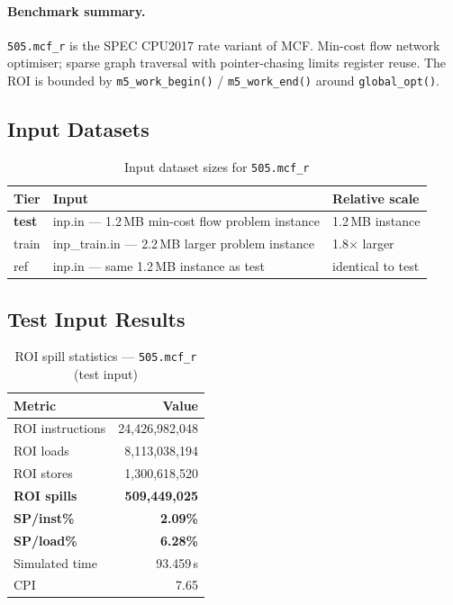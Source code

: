 \documentclass[11pt,a4paper]{article}
\begin{document}
\paragraph{Benchmark summary.}
\texttt{505.mcf\_r} is the SPEC CPU2017 rate variant of MCF.
Min-cost flow network optimiser; sparse graph traversal with pointer-chasing limits register reuse.
The ROI is bounded by \texttt{m5\_work\_begin()} / \texttt{m5\_work\_end()}
around \texttt{global\_opt()}.

\subsection{Input Datasets}

\begin{table}[H]
\centering
\caption{Input dataset sizes for \texttt{505.mcf\_r}}
\label{tab:mcf_inputs}
\small
\begin{tabular}{lp{8cm}l}
\toprule
\textbf{Tier} & \textbf{Input} & \textbf{Relative scale} \\
\midrule
\textbf{test} & inp.in --- 1.2\,MB min-cost flow problem instance & 1.2\,MB instance \\
train & inp\_train.in --- 2.2\,MB larger problem instance & 1.8$\times$ larger \\
ref & inp.in --- same 1.2\,MB instance as test & identical to test \\
\bottomrule
\end{tabular}
\end{table}

\subsection{Test Input Results}

\begin{table}[H]
\centering
\caption{ROI spill statistics --- \texttt{505.mcf\_r} (test input)}
\label{tab:mcf_test_roi}
\begin{tabular}{lr}
\toprule
\textbf{Metric} & \textbf{Value} \\
\midrule
ROI instructions & 24,426,982,048 \\
ROI loads        & 8,113,038,194 \\
ROI stores       & 1,300,618,520 \\
\textbf{ROI spills}   & \textbf{509,449,025} \\
\textbf{SP/inst\%}   & \textbf{2.09\%} \\
\textbf{SP/load\%}   & \textbf{6.28\%} \\
Simulated time   & 93.459\,s \\
CPI              & 7.65 \\
\bottomrule
\end{tabular}
\end{table}
\end{document}
